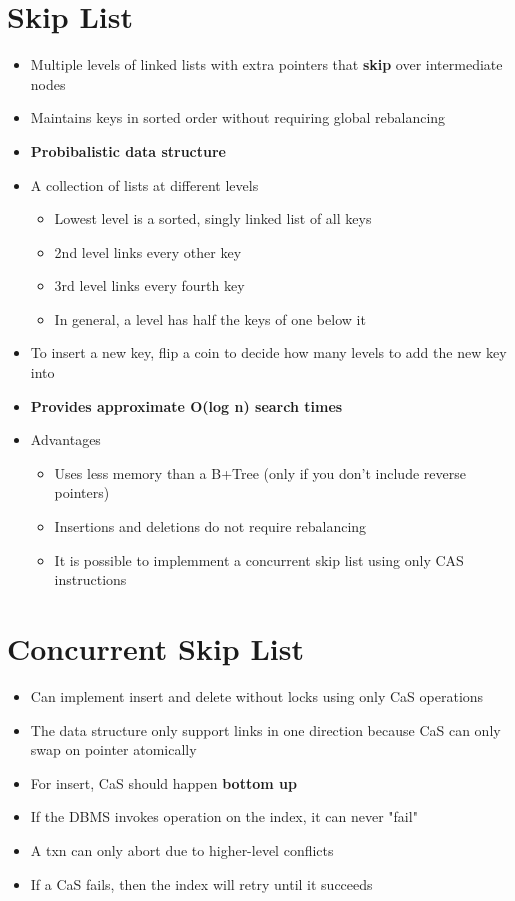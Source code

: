\documentclass[11pt]{article}
\begin{document}
\section{Skip List~\cite{p668-pugh}}
\begin{itemize}
    \item Multiple levels of linked lists with extra pointers that \textbf{skip} over intermediate nodes
    \item Maintains keys in sorted order without requiring global rebalancing
    \item \textbf{Probibalistic data structure}
    \item A collection of lists at different levels
    \begin{itemize}
        \item Lowest level is a sorted, singly linked list of all keys
        \item 2nd level links every other key
        \item 3rd level links every fourth key
        \item In general, a level has half the keys of one below it
    \end{itemize}
    \item To insert a new key, flip a coin to decide how many levels to add the new key into
    \item \textbf{Provides approximate O(log n) search times}
    \item Advantages
    \begin{itemize}
        \item Uses less memory than a B+Tree (only if you don't include reverse pointers)
        \item Insertions and deletions do not require rebalancing
        \item It is possible to implemment a concurrent skip list using only CAS instructions
    \end{itemize}
\end{itemize}

\section{Concurrent Skip List~\cite{hpugh-concurrent-tr1990}}
\begin{itemize}
    \item Can implement insert and delete without locks using only CaS operations
    \item The data structure only support links in one direction because CaS can only swap on pointer atomically
    \item For insert, CaS should happen \textbf{bottom up}
    \item If the DBMS invokes operation on the index, it can never "fail"
    \item A txn can only abort due to higher-level conflicts
    \item If a CaS fails, then the index will retry until it succeeds
\end{itemize}
\end{document}
